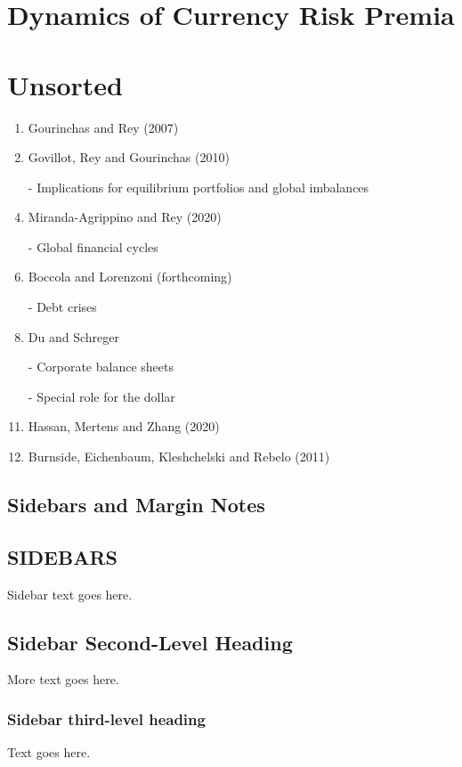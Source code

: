 \documentclass{ar-1col}
\begin{document}
\section{Dynamics of Currency Risk Premia}


\section{Unsorted}
\begin{enumerate}
\item Gourinchas and Rey (2007)
\item Govillot, Rey and Gourinchas (2010)
\item[-] Implications for equilibrium portfolios and global imbalances
\item Miranda-Agrippino and Rey (2020)
\item[-] Global financial cycles
\item Boccola and Lorenzoni (forthcoming)
\item[-] Debt crises
\item Du and Schreger
\item[-] Corporate balance sheets
\item[-] Special role for the dollar
\item Hassan, Mertens and Zhang (2020)
\item Burnside, Eichenbaum, Kleshchelski and Rebelo (2011)
\end{enumerate}



\subsection{Sidebars and Margin Notes}
\begin{marginnote}[]
\end{marginnote}

\begin{textbox}[h]\section{SIDEBARS}
Sidebar text goes here.
\subsection{Sidebar Second-Level Heading}
More text goes here.\subsubsection{Sidebar third-level heading}
Text goes here.\end{textbox}
\end{document}
